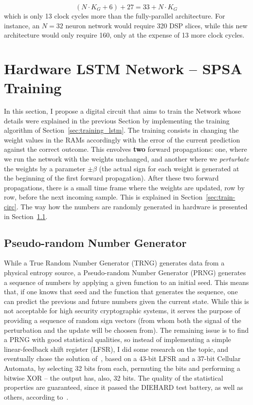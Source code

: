 \begin{equation}\label{eq:numcc_network-opt}
    (N \cdot K_G + 6) + 27  = 33 + N\cdot K_G
\end{equation}
which is only 13 clock cycles more than the fully-parallel architecture. For instance, an $N=32$ neuron network would require 320 DSP slices, while this new architecture would only require 160, only at the expense of 13 more clock cycles.


\section{Hardware LSTM Network -- SPSA Training}
In this section, I propose a digital circuit that aims to train the Network whose details were explained in the previous Section by implementing the training algorithm of Section~\ref{sec:training_lstm}. The training consists in changing the weight values in the RAMs accordingly with the error of the current prediction against the correct outcome. This envolves \textbf{two} forward propagations: one, where we run the network with the weights unchanged, and another where we \emph{perturbate} the weights by a parameter $\pm \beta$ (the actual sign for each weight is generated at the beginning of the first forward propagation). After these two forward propagations, there is a small time frame where the weights are updated, row by row, before the next incoming sample. This is explained in Section~\ref{sec:train-circ}. The way how the numbers are randomly generated in hardware is presented in Section~\ref{sec:randnum-circ}.

\subsection{Pseudo-random Number Generator}\label{sec:randnum-circ}
While a True Random Number Generator (TRNG) generates data from a physical entropy source, a Pseudo-random Number Generator (PRNG) generates a sequence of numbers by applying a given
function to an initial seed. This means that, if one knows that seed and the function that generates the sequence, one can predict the previous and future numbers given the current state. While this
is not acceptable for high security cryptographic systems, it serves the purpose of providing a sequence of random sign vectors (from whom both the signal of the perturbation and the update will be choosen from).
The remaining issue is to find a PRNG with good statistical qualities, so instead of implementing a simple linear-feedback shift register (LFSR), I did some research on the topic, and eventually chose the solution
of~\cite{Tkacik2003}, based on a 43-bit LFSR and a 37-bit Cellular Automata, by selecting 32 bits from each, permuting the bits and performing a bitwise XOR -- the output has, also, 32 bits. The quality of the 
statistical properties are guaranteed, since it passed the DIEHARD test battery, as well as others, according to~\cite{Tkacik2003}.

